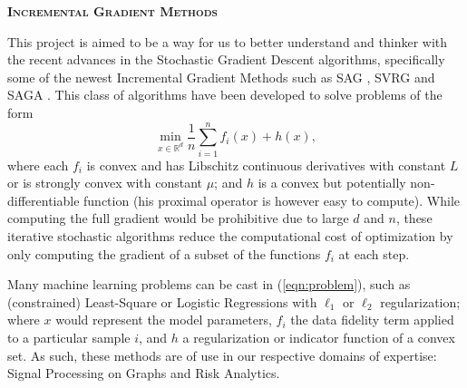 \documentclass[a4paper,11pt]{article}
\newcommand{\R}{\mathbb{R}}
\newcommand{\eqnref}[1]{(\ref{eqn:#1})}
\begin{document}
\begin{center} 
	\Large{\textbf{\textsc{Incremental Gradient Methods}}}
\end{center}

This project is aimed to be a way for us to better understand and thinker with
the recent advances in the Stochastic Gradient Descent algorithms, specifically
some of the newest Incremental Gradient Methods such as SAG
\cite{schmidt_minimizing_2013}, SVRG \cite{johnson_accelerating_2013} and SAGA
\cite{defazio_saga_2014}. This class of algorithms have been developed to solve
problems of the form
\begin{equation} \label{eqn:problem}
	\min_{x \in \R^d} \frac{1}{n} \sum_{i=1}^n f_i(x) + h(x),
\end{equation}
where each $f_i$ is convex and has Libschitz continuous derivatives with
constant $L$ or is strongly convex with constant $\mu$; and $h$ is a convex but
potentially non-differentiable function (his proximal operator is however easy
to compute). While computing the full gradient would be prohibitive due to large
$d$ and $n$, these iterative stochastic algorithms reduce the computational cost
of optimization by only computing the gradient of a subset of the functions
$f_i$ at each step.

Many machine learning problems can be cast in \eqnref{problem}, such as
(constrained) Least-Square or Logistic Regressions with $\ell_1$ or $\ell_2$
regularization; where $x$ would represent the model parameters, $f_i$ the data
fidelity term applied to a particular sample $i$, and $h$ a regularization or
indicator function of a convex set. As such, these methods are of use in our
respective domains of expertise: Signal Processing on Graphs and Risk Analytics.
\end{document}
